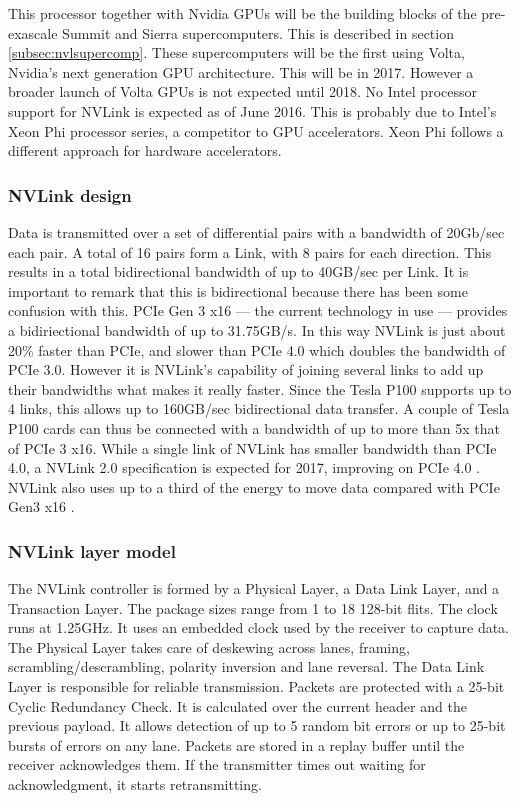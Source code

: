 This processor together with Nvidia GPUs will be the building blocks of the pre-exascale Summit and Sierra supercomputers.
This is described in section \ref{subsec:nvlsupercomp}.
These supercomputers will be the first using Volta, Nvidia's next generation GPU architecture.
This will be in 2017.
However a broader launch of Volta GPUs is not expected until 2018.
No Intel processor support for NVLink is expected as of June 2016.
This is probably due to Intel's Xeon Phi processor series, a competitor to GPU accelerators.
Xeon Phi follows a different approach for hardware accelerators.

\subsubsection{NVLink design}
Data is transmitted over a set of differential pairs with a bandwidth of 20Gb/sec each pair.
A total of 16 pairs form a Link, with 8 pairs for each direction.
This results in a total bidirectional bandwidth of up to 40GB/sec per Link.
It is important to remark that this is bidirectional because there has been some confusion with this.
PCIe Gen 3 x16 --- the current technology in use --- provides a bidiriectional bandwidth of up to 31.75GB/s.
In this way NVLink is just about 20\% faster than PCIe, and slower than PCIe 4.0 which doubles the bandwidth of PCIe 3.0.
However it is NVLink's capability of joining several links to add up their bandwidths what makes it really faster.
Since the Tesla P100 supports up to 4 links, this allows up to 160GB/sec bidirectional data transfer.
A couple of Tesla P100 cards can thus be connected with a bandwidth of up to more than 5x that of PCIe 3 x16.
While a single link of NVLink has smaller bandwidth than PCIe 4.0, a NVLink 2.0 specification is expected for 2017, improving on PCIe 4.0 \cite{nextplatform:nvlink}.
NVLink also uses up to a third of the energy to move data compared with PCIe Gen3 x16 \cite{nvidia:hpcnvlink}.

\subsubsection{NVLink layer model}
The NVLink controller is formed by a Physical Layer, a Data Link Layer, and a Transaction Layer.
The package sizes range from 1 to 18 128-bit flits.
The clock runs at 1.25GHz.
It uses an embedded clock used by the receiver to capture data.
The Physical Layer takes care of deskewing across lanes, framing, scrambling/descrambling, polarity inversion and lane reversal.
The Data Link Layer is responsible for reliable transmission.
Packets are protected with a 25-bit Cyclic Redundancy Check.
It is calculated over the current header and the previous payload.
It allows detection of up to 5 random bit errors or up to 25-bit bursts of errors on any lane.
Packets are stored in a replay buffer until the receiver acknowledges them.
If the transmitter times out waiting for acknowledgment, it starts retransmitting.

